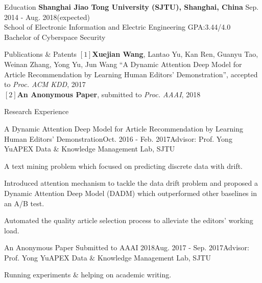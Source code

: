 \documentclass{resume} %
\begin{document}
\vspace{-1em}
\begin{rSection}{Education}
\textbf{Shanghai Jiao Tong University (SJTU), Shanghai, China} \hfill Sep. 2014 - Aug. 2018(expected)\\ %
School of Electronic Information and Electric Engineering  \hfill GPA:3.44/4.0 \\
Bachelor of Cyberspace Security
\end{rSection}

\begin{rSection}{Publications $\&$ Patents}
$[1]$\textbf{Xuejian Wang}, Lantao Yu, Kan Ren, Guanyu Tao, Weinan Zhang, Yong Yu, Jun Wang ``A Dynamic Attention Deep Model for Article Recommendation by Learning Human Editors’ Demonstration'', accepted to  \emph{Proc. ACM KDD}, 2017\\
$[2]$\textbf{An Anonymous Paper}, submitted to  \emph{Proc. AAAI}, 2018\\
\end{rSection}
\begin{rSection}{Research Experience}
\begin{rSubsection}{A Dynamic Attention Deep Model for Article Recommendation
by Learning Human Editors’ Demonstration}{Oct. 2016 - Feb. 2017}{Advisor: Prof. Yong Yu}{APEX Data $\&$ Knowledge Management Lab, SJTU}
\item A text mining problem which focused on predicting discrete data with drift.
\item Introduced attention mechanism to tackle the data drift problem and proposed a Dynamic Attention Deep Model (DADM) which outperformed other baselines in an A/B test.
\item Automated the quality article selection process to alleviate the editors' working load.
\end{rSubsection}
\begin{rSubsection}{An Anonymous Paper Submitted to AAAI 2018}{Aug. 2017 - Sep. 2017}{Advisor: Prof. Yong Yu}{APEX Data $\&$ Knowledge Management Lab, SJTU}
\item Running experiments $\&$ helping on academic writing.
\end{rSubsection}

\end{rSection}
\end{document}
